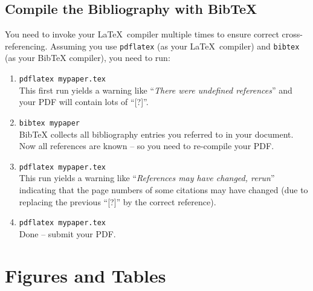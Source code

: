 \documentclass[11pt,a4paper]{article}
\begin{document}
%
\subsection{Compile the Bibliography with BibTeX}
\label{sec-bibtex-compile}

You need to invoke your \LaTeX~compiler multiple times to ensure correct 
cross-referencing.
Assuming you use \texttt{pdflatex} (as your \LaTeX~compiler) and \texttt{bibtex} (as your BibTeX compiler), you need to run:
\begin{enumerate}
 
\item \texttt{pdflatex mypaper.tex}\\[.5em]
This first run yields a warning like ``\emph{There were undefined references}'' and your PDF will contain lots of ``[?]''.

\item \texttt{bibtex mypaper}\\[.5em]
BibTeX collects all bibliography entries you referred to in your document. Now all references are known -- so you need to re-compile your PDF.

\item \texttt{pdflatex mypaper.tex}\\[.5em]
This run yields a warning like ``\emph{References may have changed, rerun}'' indicating that the page numbers of some citations may have changed (due to replacing the previous ``[?]'' by the correct reference).

\item \texttt{pdflatex mypaper.tex}\\[.5em]
Done -- submit your PDF.

\end{enumerate}



\newpage
\section{Figures and Tables}
\label{sec-figures}
\end{document}
